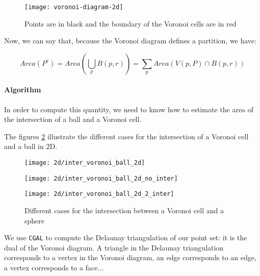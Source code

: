 \begin{figure}[h]
    \centering
    \texttt{[image: voronoi-diagram-2d]}
    \caption{Points are in black and the boundary of the Voronoi cells are in
        red}
    \label{fig:voronoi-diagram-2d}
\end{figure}

Now, we can say that, because the Voronoi diagram defines a partition, we have:

$$ Area(P^r) = Area \left( \bigcup_p B(p, r) \right) = \sum_p Area(V(p, P) \cap B(p, r)) $$

\paragraph{Algorithm}

In order to compute this quantity, we need to know how to estimate the area of the
intersection of a ball and a Voronoi cell.

The figures \ref{fig:inter_voronoi_ball_2d} illustrate the different cases for
the intersection of a Voronoi cell and a ball in 2D.

\begin{figure}[h]
    \centering
    \begin{minipage}{0.32\linewidth}
        \centering
        \texttt{[image: 2d/inter\_voronoi\_ball\_2d]}
        \label{fig:inter_voronoi_ball_2d:a}
    \end{minipage}
    \begin{minipage}{0.32\linewidth}
        \centering
        \texttt{[image: 2d/inter\_voronoi\_ball\_2d\_no\_inter]}
        \label{fig:inter_voronoi_ball_2d:b}
    \end{minipage}
    \begin{minipage}{0.32\linewidth}
        \centering
        \texttt{[image: 2d/inter\_voronoi\_ball\_2d\_2\_inter]}
        \label{fig:inter_voronoi_ball_2d:c}
    \end{minipage}

   \caption{Different cases for the intersection between a Voronoi cell and a sphere}
   \label{fig:inter_voronoi_ball_2d}
\end{figure}

We use \texttt{CGAL} to compute the Delaunay triangulation of our point set: it
is the dual of the Voronoi diagram. A triangle in the Delaunay
triangulation corresponds to a vertex in the Voronoi diagram, an edge
corresponds to an edge, a vertex corresponds to a face...

